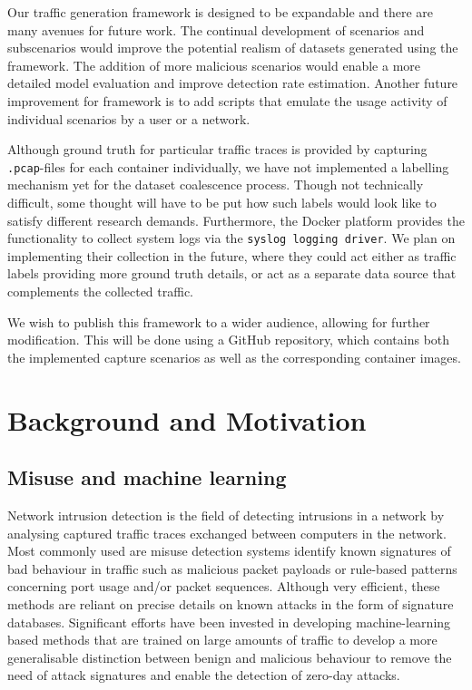 \documentclass[sigconf]{acmart}
\begin{document}
Our traffic generation framework is designed to be expandable and there are many avenues for future work. The continual development of scenarios and subscenarios would improve the potential realism of datasets generated using the framework. The addition of more malicious scenarios would enable a more detailed model evaluation and improve detection rate estimation. 
Another future improvement for framework is to add scripts that emulate the usage activity of individual scenarios by a user or a network. 


Although ground truth for particular traffic traces is provided by capturing \texttt{.pcap}-files for each container individually, we have not implemented a labelling mechanism yet for the dataset coalescence process. Though not technically difficult, some thought will have to be put how such labels would look like to satisfy different research demands.
Furthermore, the Docker platform provides the functionality to collect system logs via the \texttt{syslog logging driver}. We plan on implementing their collection in the future, where they could act either as traffic labels providing more ground truth details, or act as a separate data source that complements the collected traffic.

We wish to publish this framework to a wider audience, allowing for further modification. This will be done using a GitHub repository, which contains both the implemented capture scenarios as well as the corresponding container images.


\section{Background and Motivation}

\subsection{Misuse and machine learning}


Network intrusion detection is the field of detecting intrusions in a network by analysing captured traffic traces exchanged between computers in the network. Most commonly used are misuse detection systems identify known signatures of bad behaviour in traffic such as malicious packet payloads or rule-based patterns concerning port usage and/or packet sequences. Although very efficient, these methods are reliant on precise details on known attacks in the form of signature databases. Significant efforts have been invested in developing machine-learning based methods that are trained on large amounts of traffic to develop a more generalisable distinction between benign and malicious behaviour to remove the need of attack signatures and enable the detection of zero-day attacks.
\end{document}
